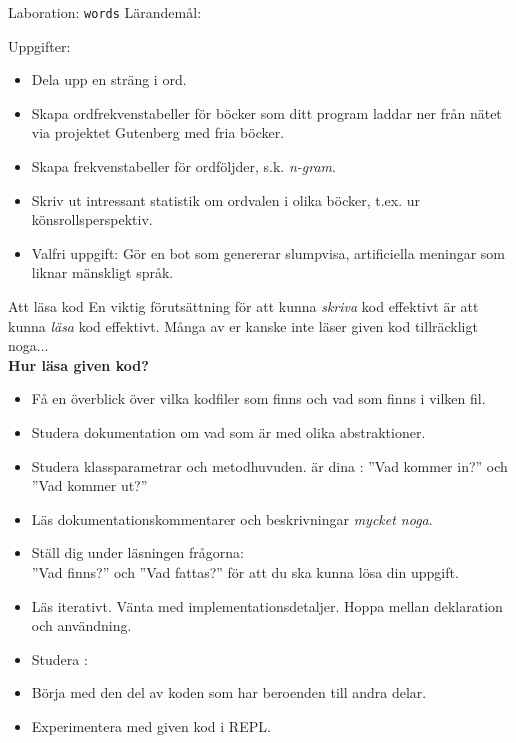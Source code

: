 \begin{Slide}{Laboration: \texttt{words}}
Lärandemål:
\begin{itemize}\SlideFontSmall

\end{itemize}
Uppgifter:
\begin{itemize}\SlideFontSmall
  \item Dela upp en sträng i ord.
  \item Skapa ordfrekvenstabeller för böcker som ditt program laddar ner från nätet via projektet Gutenberg med fria böcker.
  \item Skapa frekvenstabeller för ordföljder, s.k. \emph{n-gram}.
  \item Skriv ut intressant statistik om ordvalen i olika böcker, t.ex. ur könsrollsperspektiv.
  \item Valfri uppgift: Gör en bot som genererar slumpvisa, artificiella meningar som liknar mänskligt språk.
\end{itemize}
\end{Slide}

\begin{Slide}{Att läsa kod} \SlideFontSmall
  En viktig förutsättning för att kunna \emph{skriva} kod effektivt är att kunna \emph{läsa} kod effektivt. Många av er kanske inte läser given kod tillräckligt noga... \\ \vspace{0.5em}\textbf{Hur läsa given kod?}
  \begin{itemize}\SlideFontSmall
    \item Få en överblick över vilka kodfiler som finns och vad som finns i vilken fil.
    \item Studera dokumentation om vad som är  med olika abstraktioner.
    \item Studera klassparametrar och metodhuvuden.  är dina : ''Vad kommer in?'' och ''Vad kommer ut?''
    \item Läs dokumentationskommentarer och beskrivningar \emph{mycket noga}.
    \item Ställ dig under läsningen frågorna: \\ ''Vad finns?'' och ''Vad fattas?'' för att du ska kunna lösa din uppgift.
    \item Läs iterativt. Vänta med implementationsdetaljer. Hoppa mellan deklaration och användning.
    \item Studera : 
    \item Börja med den del av koden som har  beroenden till andra delar.
    \item Experimentera med given kod i REPL.
  \end{itemize}
\end{Slide}

